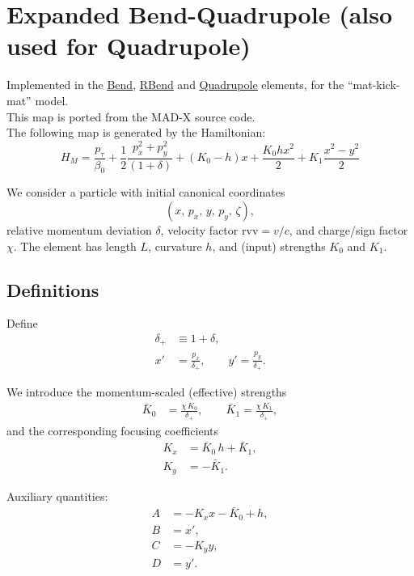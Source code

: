 \section{Expanded Bend-Quadrupole (also used for Quadrupole)}
\label{sec:expanded_bend_quadrupole}

Implemented in the \href{https://xsuite.readthedocs.io/en/latest/apireference.html#bend}{\underline{Bend}},
\href{https://xsuite.readthedocs.io/en/latest/apireference.html#rbend}{\underline{RBend}} and
\href{https://xsuite.readthedocs.io/en/latest/apireference.html#quadrupole}{\underline{Quadrupole}} elements,
for the ``mat-kick-mat'' model.
~\\
This map is ported from the MAD-X source code.
~\\

The following map is generated by the Hamiltonian:
\begin{equation}
  H_{M} = \frac{p_\tau}{\beta_0} +  \frac{1}{2}\frac{p_x^2 + p_y^2}{(1 + \delta)} + (K_0 -h)x + \frac{K_0hx^2}{2} + K_1 \frac{x^2-y^2}{2}
\end{equation}

We consider a particle with initial canonical coordinates
\[
(x,\, p_x,\, y,\, p_y,\, \zeta),
\]
relative momentum deviation $\delta$, velocity factor $\mathrm{rvv}=v/c$, and charge/sign factor $\chi$.
The element has length $L$, curvature $h$, and (input) strengths $K_0$ and $K_1$.

\subsection*{Definitions}

Define
\begin{align}
\delta_+ &\equiv 1+\delta, \\
x' &= \frac{p_x}{\delta_+}, \qquad
y' = \frac{p_y}{\delta_+}.
\end{align}

We introduce the momentum-scaled (effective) strengths
\begin{align}
\bar{K}_0 &= \frac{\chi\, K_0}{\delta_+}, \qquad
\bar{K}_1 = \frac{\chi\, K_1}{\delta_+},
\end{align}
and the corresponding focusing coefficients
\begin{align}
K_x &= \bar{K}_0\, h + \bar{K}_1, \\
K_y &= -\bar{K}_1 .
\end{align}

Auxiliary quantities:
\begin{align}
A &= -K_x x - \bar{K}_0 + h, \\
B &= x', \\
C &= -K_y y, \\
D &= y'.
\end{align}

